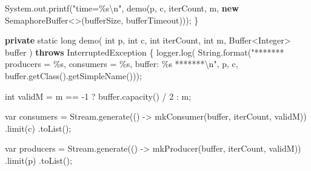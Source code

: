 \documentclass[11pt]{article}
\newenvironment{Shaded}{}{}
\newcommand{\KeywordTok}[1]{\textcolor[rgb]{0.00,0.44,0.13}{\textbf{{#1}}}}
\newcommand{\DataTypeTok}[1]{\textcolor[rgb]{0.56,0.13,0.00}{{#1}}}
\newcommand{\DecValTok}[1]{\textcolor[rgb]{0.25,0.63,0.44}{{#1}}}
\newcommand{\StringTok}[1]{\textcolor[rgb]{0.25,0.44,0.63}{{#1}}}
\newcommand{\FunctionTok}[1]{\textcolor[rgb]{0.02,0.16,0.49}{{#1}}}
\newcommand{\NormalTok}[1]{{#1}}
\newcommand{\SpecialCharTok}[1]{\textcolor[rgb]{0.25,0.44,0.63}{{#1}}}
\newcommand{\OperatorTok}[1]{\textcolor[rgb]{0.40,0.40,0.40}{{#1}}}
\newcommand{\BuiltInTok}[1]{{#1}}
\begin{document}
\begin{Shaded}
\begin{Highlighting}[]
        \BuiltInTok{System}\OperatorTok{.}\FunctionTok{out}\OperatorTok{.}\FunctionTok{printf}\OperatorTok{(}\StringTok{"time=}\SpecialCharTok{\%s\textbackslash{}n}\StringTok{"}\OperatorTok{,}
                \FunctionTok{demo}\OperatorTok{(}\NormalTok{p}\OperatorTok{,}\NormalTok{ c}\OperatorTok{,}\NormalTok{ iterCount}\OperatorTok{,}\NormalTok{ m}\OperatorTok{,} \KeywordTok{new}\NormalTok{ SemaphoreBuffer}\OperatorTok{\textless{}\textgreater{}(}\NormalTok{bufferSize}\OperatorTok{,}\NormalTok{ bufferTimeout}\OperatorTok{)));}
    \OperatorTok{\}}

    \KeywordTok{private} \DataTypeTok{static} \DataTypeTok{long} \FunctionTok{demo}\OperatorTok{(}
            \DataTypeTok{int}\NormalTok{ p}\OperatorTok{,} \DataTypeTok{int}\NormalTok{ c}\OperatorTok{,}
            \DataTypeTok{int}\NormalTok{ iterCount}\OperatorTok{,} \DataTypeTok{int}\NormalTok{ m}\OperatorTok{,}
            \BuiltInTok{Buffer}\OperatorTok{\textless{}}\BuiltInTok{Integer}\OperatorTok{\textgreater{}}\NormalTok{ buffer}
    \OperatorTok{)} \KeywordTok{throws} \BuiltInTok{InterruptedException} \OperatorTok{\{}
\NormalTok{        logger}\OperatorTok{.}\FunctionTok{log}\OperatorTok{(}
            \BuiltInTok{String}\OperatorTok{.}\FunctionTok{format}\OperatorTok{(}\StringTok{"******* producers = }\SpecialCharTok{\%s}\StringTok{, consumers = }\SpecialCharTok{\%s}\StringTok{, buffer: }\SpecialCharTok{\%s}\StringTok{ *******}\SpecialCharTok{\textbackslash{}n}\StringTok{"}\OperatorTok{,}
\NormalTok{                p}\OperatorTok{,}\NormalTok{ c}\OperatorTok{,}\NormalTok{ buffer}\OperatorTok{.}\FunctionTok{getClass}\OperatorTok{().}\FunctionTok{getSimpleName}\OperatorTok{()));}

        \DataTypeTok{int}\NormalTok{ validM }\OperatorTok{=}\NormalTok{ m }\OperatorTok{==} \OperatorTok{{-}}\DecValTok{1} \OperatorTok{?}\NormalTok{ buffer}\OperatorTok{.}\FunctionTok{capacity}\OperatorTok{()} \OperatorTok{/} \DecValTok{2} \OperatorTok{:}\NormalTok{ m}\OperatorTok{;}

        \DataTypeTok{var}\NormalTok{ consumers }\OperatorTok{=}\NormalTok{ Stream}\OperatorTok{.}\FunctionTok{generate}\OperatorTok{(()} \OperatorTok{{-}\textgreater{}} \FunctionTok{mkConsumer}\OperatorTok{(}\NormalTok{buffer}\OperatorTok{,}\NormalTok{ iterCount}\OperatorTok{,}\NormalTok{ validM}\OperatorTok{))}
                \OperatorTok{.}\FunctionTok{limit}\OperatorTok{(}\NormalTok{c}\OperatorTok{)}
                \OperatorTok{.}\FunctionTok{toList}\OperatorTok{();}

        \DataTypeTok{var}\NormalTok{ producers }\OperatorTok{=}\NormalTok{ Stream}\OperatorTok{.}\FunctionTok{generate}\OperatorTok{(()} \OperatorTok{{-}\textgreater{}} \FunctionTok{mkProducer}\OperatorTok{(}\NormalTok{buffer}\OperatorTok{,}\NormalTok{ iterCount}\OperatorTok{,}\NormalTok{ validM}\OperatorTok{))}
                \OperatorTok{.}\FunctionTok{limit}\OperatorTok{(}\NormalTok{p}\OperatorTok{)}
                \OperatorTok{.}\FunctionTok{toList}\OperatorTok{();}


\end{Highlighting}
\end{Shaded}
\end{document}
